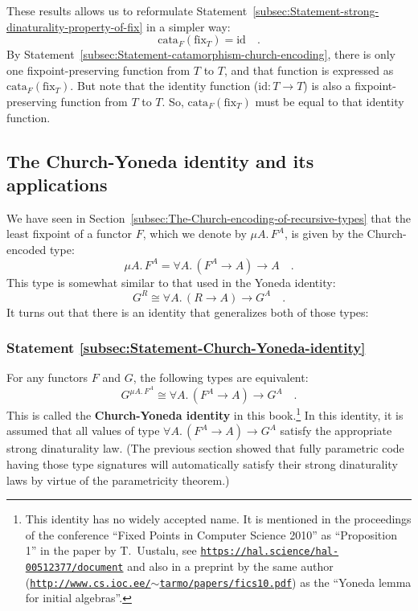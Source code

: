 These results allows us to reformulate Statement~\ref{subsec:Statement-strong-dinaturality-property-of-fix}
in a simpler way:
\[
\text{cata}_{F}(\text{fix}_{T})=\text{id}\quad.
\]
By Statement~\ref{subsec:Statement-catamorphism-church-encoding},
there is only one fixpoint-preserving function from $T$ to $T$,
and that function is expressed as $\text{cata}_{F}(\text{fix}_{T})$.
But note that the identity function ($\text{id}:T\rightarrow T$)
is also a fixpoint-preserving function from $T$ to $T$. So, $\text{cata}_{F}(\text{fix}_{T})$
must be equal to that identity function.

\subsection{The Church-Yoneda identity and its applications}

We have seen in Section~\ref{subsec:The-Church-encoding-of-recursive-types}
that the least fixpoint of a functor $F$, which we denote by $\mu A.\,F^{A}$,
is given by the Church-encoded type:
\[
\mu A.\,F^{A}=\forall A.\,(F^{A}\rightarrow A)\rightarrow A\quad.
\]
This type is somewhat similar to that used in the Yoneda identity:
\[
G^{R}\cong\forall A.\,(R\rightarrow A)\rightarrow G^{A}\quad.
\]
It turns out that there is an identity that generalizes both of those
types:

\subsubsection{Statement \label{subsec:Statement-Church-Yoneda-identity}\ref{subsec:Statement-Church-Yoneda-identity}}

For any functors $F$ and $G$, the following types are equivalent:
\[
G^{\mu A.\,F^{A}}\cong\forall A.\,(F^{A}\rightarrow A)\rightarrow G^{A}\quad.
\]
This is called the \textbf{Church-Yoneda
identity} in this book.\footnote{This identity has no widely accepted name. It is mentioned in the
proceedings of the conference \textsf{``}Fixed Points in Computer Science
2010\textsf{''} as \textsf{``}Proposition 1\textsf{''} in the paper by T.~Uustalu,
see \texttt{\href{https://hal.science/hal-00512377/document}{https://hal.science/hal-00512377/document}}
and also in a preprint by the same author (\texttt{\href{https://web.archive.org/web/20110601105059/http://www.cs.ioc.ee/~tarmo/papers/fics10.pdf}{http://www.cs.ioc.ee/$\sim$tarmo/papers/fics10.pdf}})
as the \textsf{``}Yoneda lemma for initial algebras\textsf{''}.} In this identity, it is assumed that all values of type $\forall A.\,(F^{A}\rightarrow A)\rightarrow G^{A}$
satisfy the appropriate strong dinaturality law. (The previous section
showed that fully parametric code having those type signatures will
automatically satisfy their strong dinaturality laws by virtue of
the parametricity theorem.)

